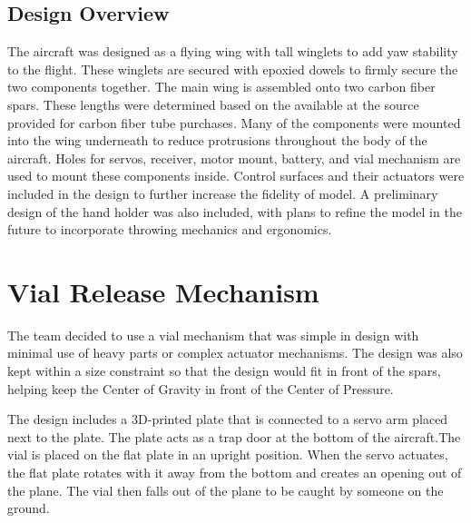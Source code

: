     
    \subsection{Design Overview}
    
        The aircraft was designed as a flying wing with tall winglets to add yaw stability to the flight. These winglets are secured with epoxied dowels to firmly secure the two components together. The main wing is assembled onto two carbon fiber spars. These lengths were determined based on the available at the source provided for carbon fiber tube purchases. Many of the components were mounted into the wing underneath to reduce protrusions throughout the body of the aircraft. Holes for servos, receiver, motor mount, battery, and vial mechanism are used to mount these components inside. Control surfaces and their actuators were included in the design to further increase the fidelity of model. A preliminary design of the hand holder was also included, with plans to refine the model in the future to incorporate throwing mechanics and ergonomics.

\section{Vial Release Mechanism}

    The team decided to use a vial mechanism that was simple in design with minimal use of heavy parts or complex actuator mechanisms. The design was also kept within a size constraint so that the design would fit in front of the spars, helping keep the Center of Gravity in front of the Center of Pressure. 
    
    The design includes a 3D-printed plate that is connected to a servo arm placed next to the plate. The plate acts as a trap door at the bottom of the aircraft.The vial is placed on the flat plate in an upright position. When the servo actuates, the flat plate rotates with it away from the bottom and creates an opening out of the plane. The vial then falls out of the plane to be caught by someone on the ground.
    
